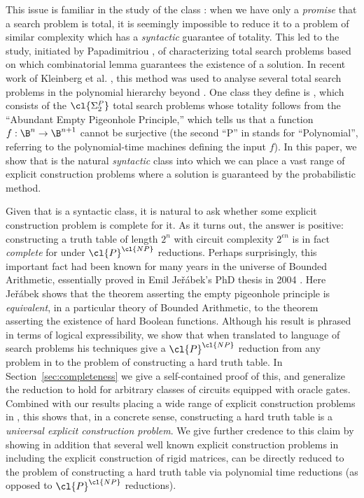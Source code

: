 This issue is familiar in the study of the class : when we have only a \emph{promise} that a search problem is total, it is seemingly impossible to reduce it to a problem of similar complexity which has a \emph{syntactic} guarantee of totality. This led to the study, initiated by Papadimitriou \cite{christos}, of characterizing total search problems based on which combinatorial lemma guarantees the existence of a solution. In recent work of Kleinberg et al. \cite{total}, this method was used to analyse several total search problems in the polynomial hierarchy beyond . One class they define is , which consists of the $\cl{\Sigma_2^P}$ total search problems whose totality follows from the ``Abundant Empty Pigeonhole Principle,'' which tells us that a function $f: \B^n \rightarrow \B^{n+1}$ cannot be surjective (the second ``P'' in  stands for ``Polynomial'', referring to the polynomial-time machines defining the input $f$). In this paper, we show that  is the natural \emph{syntactic} class into which we can place a vast range of explicit construction problems where a solution is guaranteed by the probabilistic method.

Given that  is a syntactic class, it is natural to ask whether some explicit construction problem is complete for it. As it turns out, the answer is positive: constructing a truth table of length $2^n$ with circuit complexity $2^{\epsilon n}$ is in fact \emph{complete} for  under $\cl{P}^\cl{NP}$ reductions. Perhaps surprisingly, this important fact had been known for many years in the universe of Bounded Arithmetic, essentially proved in Emil Je\v{r}\'{a}bek's PhD thesis in 2004 \cite{Jerabek}. Here Je\v{r}\'{a}bek shows that the theorem asserting the empty pigeonhole principle is \emph{equivalent}, in a particular theory of Bounded Arithmetic, to the theorem asserting the existence of hard Boolean functions. Although his result is phrased in terms of logical expressibility, we show that when translated to language of search problems his techniques give a $\cl{P}^\cl{NP}$ reduction from any problem in  to the problem of constructing a hard truth table. In Section~\ref{sec:completeness} we give a self-contained proof of this, and generalize the reduction to hold for arbitrary classes of circuits equipped with oracle gates. Combined with our results placing a wide range of explicit construction problems in , this shows that, in a concrete sense, constructing a hard truth table is a \emph{universal explicit construction problem}. We give further credence to this claim by showing in addition that several well known explicit construction problems in  including the explicit construction of rigid matrices, can be directly reduced to the problem of constructing a hard truth table via polynomial time reductions (as opposed to $\cl{P}^\cl{NP}$ reductions).

